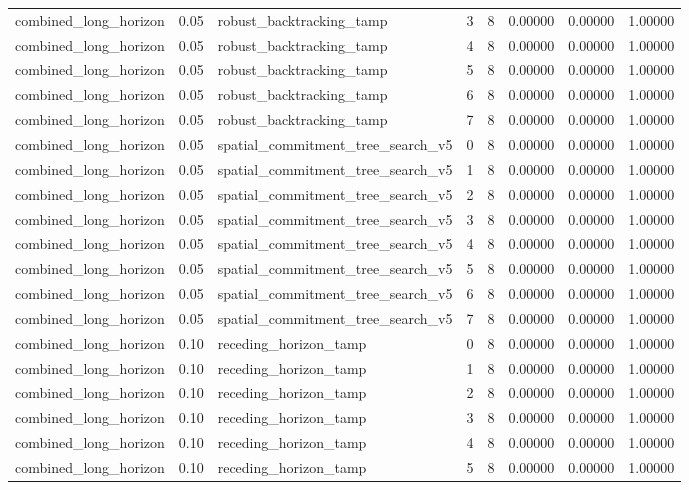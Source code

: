 \documentclass{article}
\begin{document}
\begin{table}[tbp]
{\begin{tabular}{llllllll}
combined\_long\_horizon & 0.05 & robust\_backtracking\_tamp & 3 & 8 & 0.00000 & 0.00000 & 1.00000 \\
combined\_long\_horizon & 0.05 & robust\_backtracking\_tamp & 4 & 8 & 0.00000 & 0.00000 & 1.00000 \\
combined\_long\_horizon & 0.05 & robust\_backtracking\_tamp & 5 & 8 & 0.00000 & 0.00000 & 1.00000 \\
combined\_long\_horizon & 0.05 & robust\_backtracking\_tamp & 6 & 8 & 0.00000 & 0.00000 & 1.00000 \\
combined\_long\_horizon & 0.05 & robust\_backtracking\_tamp & 7 & 8 & 0.00000 & 0.00000 & 1.00000 \\
combined\_long\_horizon & 0.05 & spatial\_commitment\_tree\_search\_v5 & 0 & 8 & 0.00000 & 0.00000 & 1.00000 \\
combined\_long\_horizon & 0.05 & spatial\_commitment\_tree\_search\_v5 & 1 & 8 & 0.00000 & 0.00000 & 1.00000 \\
combined\_long\_horizon & 0.05 & spatial\_commitment\_tree\_search\_v5 & 2 & 8 & 0.00000 & 0.00000 & 1.00000 \\
combined\_long\_horizon & 0.05 & spatial\_commitment\_tree\_search\_v5 & 3 & 8 & 0.00000 & 0.00000 & 1.00000 \\
combined\_long\_horizon & 0.05 & spatial\_commitment\_tree\_search\_v5 & 4 & 8 & 0.00000 & 0.00000 & 1.00000 \\
combined\_long\_horizon & 0.05 & spatial\_commitment\_tree\_search\_v5 & 5 & 8 & 0.00000 & 0.00000 & 1.00000 \\
combined\_long\_horizon & 0.05 & spatial\_commitment\_tree\_search\_v5 & 6 & 8 & 0.00000 & 0.00000 & 1.00000 \\
combined\_long\_horizon & 0.05 & spatial\_commitment\_tree\_search\_v5 & 7 & 8 & 0.00000 & 0.00000 & 1.00000 \\
combined\_long\_horizon & 0.10 & receding\_horizon\_tamp & 0 & 8 & 0.00000 & 0.00000 & 1.00000 \\
combined\_long\_horizon & 0.10 & receding\_horizon\_tamp & 1 & 8 & 0.00000 & 0.00000 & 1.00000 \\
combined\_long\_horizon & 0.10 & receding\_horizon\_tamp & 2 & 8 & 0.00000 & 0.00000 & 1.00000 \\
combined\_long\_horizon & 0.10 & receding\_horizon\_tamp & 3 & 8 & 0.00000 & 0.00000 & 1.00000 \\
combined\_long\_horizon & 0.10 & receding\_horizon\_tamp & 4 & 8 & 0.00000 & 0.00000 & 1.00000 \\
combined\_long\_horizon & 0.10 & receding\_horizon\_tamp & 5 & 8 & 0.00000 & 0.00000 & 1.00000 \\
\bottomrule
\end{tabular}
}
\end{table}
\end{document}
